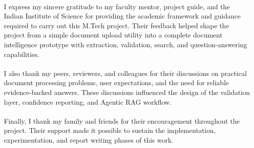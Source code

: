 \paragraph{} I express my sincere gratitude to my faculty mentor, project guide, and the Indian Institute of Science for providing the academic framework and guidance required to carry out this M.Tech project. Their feedback helped shape the project from a simple document upload utility into a complete document intelligence prototype with extraction, validation, search, and question-answering capabilities.

\paragraph{} I also thank my peers, reviewers, and colleagues for their discussions on practical document processing problems, user expectations, and the need for reliable evidence-backed answers. These discussions influenced the design of the validation layer, confidence reporting, and Agentic RAG workflow.

\paragraph{} Finally, I thank my family and friends for their encouragement throughout the project. Their support made it possible to sustain the implementation, experimentation, and report writing phases of this work.
